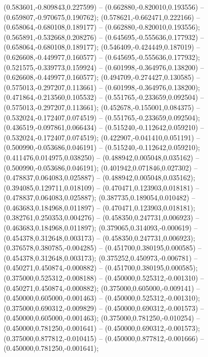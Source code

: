  (0.583601,-0.809843,0.227599) -- (0.662880,-0.820010,0.193556) -- (0.659807,-0.970675,0.190762);
 (0.578621,-0.662471,0.222166) -- (0.658064,-0.680108,0.189177) -- (0.662880,-0.820010,0.193556);
 (0.565891,-0.532668,0.208276) -- (0.645695,-0.555636,0.177932) -- (0.658064,-0.680108,0.189177);
 (0.546409,-0.424449,0.187019) -- (0.626608,-0.449977,0.160577) -- (0.645695,-0.555636,0.177932);
 (0.521575,-0.339773,0.159924) -- (0.601998,-0.364976,0.138200) -- (0.626608,-0.449977,0.160577);
 (0.494709,-0.274427,0.130585) -- (0.575013,-0.297207,0.113661) -- (0.601998,-0.364976,0.138200);
 (0.471864,-0.213560,0.105532) -- (0.551765,-0.233659,0.092504) -- (0.575013,-0.297207,0.113661);
 (0.452678,-0.155001,0.084375) -- (0.532024,-0.172407,0.074519) -- (0.551765,-0.233659,0.092504);
 (0.436519,-0.097861,0.066434) -- (0.515240,-0.112642,0.059210) -- (0.532024,-0.172407,0.074519);
 (0.422907,-0.041410,0.051191) -- (0.500990,-0.053686,0.046191) -- (0.515240,-0.112642,0.059210);
 (0.411476,0.014975,0.038250) -- (0.488942,0.005048,0.035162) -- (0.500990,-0.053686,0.046191);
 (0.401942,0.071846,0.027302) -- (0.478837,0.064083,0.025887) -- (0.488942,0.005048,0.035162);
 (0.394085,0.129711,0.018109) -- (0.470471,0.123903,0.018181) -- (0.478837,0.064083,0.025887);
 (0.387735,0.189054,0.010482) -- (0.463683,0.184968,0.011897) -- (0.470471,0.123903,0.018181);
 (0.382761,0.250353,0.004276) -- (0.458350,0.247731,0.006923) -- (0.463683,0.184968,0.011897);
 (0.379065,0.314093,-0.000619) -- (0.454378,0.312648,0.003173) -- (0.458350,0.247731,0.006923);
 (0.376578,0.380785,-0.004285) -- (0.451700,0.380195,0.000585) -- (0.454378,0.312648,0.003173);
 (0.375252,0.450973,-0.006781) -- (0.450271,0.450874,-0.000882) -- (0.451700,0.380195,0.000585);
 (0.375000,0.525312,-0.008188) -- (0.450000,0.525312,-0.001310) -- (0.450271,0.450874,-0.000882);
 (0.375000,0.605000,-0.009141) -- (0.450000,0.605000,-0.001463) -- (0.450000,0.525312,-0.001310);
 (0.375000,0.690312,-0.009829) -- (0.450000,0.690312,-0.001573) -- (0.450000,0.605000,-0.001463);
 (0.375000,0.781250,-0.010254) -- (0.450000,0.781250,-0.001641) -- (0.450000,0.690312,-0.001573);
 (0.375000,0.877812,-0.010415) -- (0.450000,0.877812,-0.001666) -- (0.450000,0.781250,-0.001641);
